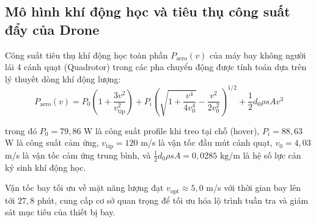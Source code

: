 \subsection{Mô hình khí động học và tiêu thụ công suất đẩy của Drone}

\hspace{0.5cm} Công suất tiêu thụ khí động học toàn phần $P_{\text{aero}}(v)$ của máy bay không người lái 4 cánh quạt (Quadrotor) trong các pha chuyển động được tính toán dựa trên lý thuyết dòng khí động lượng:
\begin{equation}
P_{\text{aero}}(v) = P_0 \left( 1 + \frac{3 v^2}{v_{\text{tip}}^2} \right) + P_i \left( \sqrt{1 + \frac{v^4}{4 v_0^4}} - \frac{v^2}{2 v_0^2} \right)^{1/2} + \frac{1}{2} d_0 \rho s A v^3
\label{eq:drone-aerodynamic-power}
\end{equation}

trong đó $P_0 = 79{,}86$ W là công suất profile khi treo tại chỗ (hover), $P_i = 88{,}63$ W là công suất cảm ứng, $v_{\text{tip}} = 120$ m/s là vận tốc đầu mút cánh quạt, $v_0 = 4{,}03$ m/s là vận tốc cảm ứng trung bình, và $\frac{1}{2} d_0 \rho s A = 0{,}0285\text{ kg/m}$ là hệ số lực cản ký sinh khí động học.

\begin{table}[H]
\centering
\caption{Đặc tính công suất tiêu thụ và thời gian bay hữu ích của DJI Matrice 100 theo vận tốc}
\label{tab:drone-power-consumption}
\end{table}

Vận tốc bay tối ưu về mặt năng lượng đạt $v_{\text{opt}} \approx 5{,}0$ m/s với thời gian bay lên tới $27{,}8$ phút, cung cấp cơ sở quan trọng để tối ưu hóa lộ trình tuần tra và giám sát mục tiêu của thiết bị bay.

